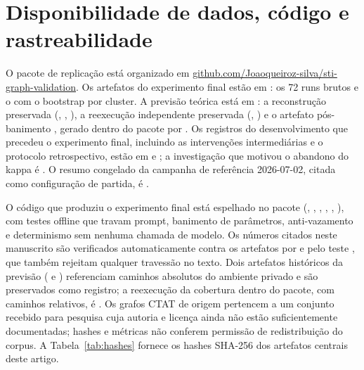 \documentclass[11pt,a4paper]{article}
\begin{document}
\section*{Disponibilidade de dados, código e rastreabilidade}

O pacote de replicação está organizado em \href{https://github.com/Joaoqueiroz-silva/sti-graph-validation}{github.com/Joaoqueiroz-silva/sti-graph-validation}. Os artefatos do experimento final estão em : os 72 runs brutos e o  com o bootstrap por cluster. A previsão teórica está em : a reconstrução preservada (, , ), a reexecução independente preservada (, ) e o artefato pós-banimento , gerado dentro do pacote por . Os registros do desenvolvimento que precedeu o experimento final, incluindo as intervenções intermediárias e o protocolo retrospectivo, estão em  e ; a investigação que motivou o abandono do kappa é . O resumo congelado da campanha de referência 2026-07-02, citada como configuração de partida, é .

O código que produziu o experimento final está espelhado no pacote (, , , , , ), com testes offline que travam prompt, banimento de parâmetros, anti-vazamento e determinismo sem nenhuma chamada de modelo. Os números citados neste manuscrito são verificados automaticamente contra os artefatos por  e pelo teste , que também rejeitam qualquer travessão no texto. Dois artefatos históricos da previsão ( e ) referenciam caminhos absolutos do ambiente privado e são preservados como registro; a reexecução da cobertura dentro do pacote, com caminhos relativos, é . Os grafos CTAT de origem pertencem a um conjunto recebido para pesquisa cuja autoria e licença ainda não estão suficientemente documentadas; hashes e métricas não conferem permissão de redistribuição do corpus. A Tabela~\ref{tab:hashes} fornece os hashes SHA-256 dos artefatos centrais deste artigo.
\end{document}
